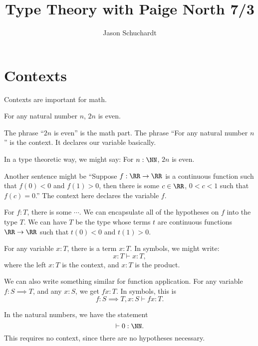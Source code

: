 \documentclass{article}
\title{Type Theory with Paige North 7/3}
\author{Jason Schuchardt}
\newcommand{\yields}{\vdash}
\begin{document}
\maketitle

\section{Contexts}

Contexts are important for math.

\begin{example}
    For any natural number $n$, $2n$ is even.

    The phrase ``$2n$ is even'' is the math part.
    The phrase ``For any natural number $n$'' is the context.
    It declares our variable basically.

    In a type theoretic way, we might say:
    For $n:\NN$, $2n$ is even.
\end{example}

\begin{example}
Another sentence might be 
``Suppose $f:\RR\to\RR$ is a continuous function such that 
$f(0)<0$ and $f(1)>0$, then there is some $c\in\RR$, 
$0 < c < 1$ such that
$f(c)=0$.''
The context here declares the variable $f$.
\end{example}

\begin{example}
For $f:T$, there is some $\cdots$. We can encapsulate all of the
hypotheses on $f$ into the type $T$. We can have $T$ be 
the type whose terms $t$ are continuous functions $\RR\to \RR$
such that $t(0)<0$ and $t(1)>0$.
\end{example}

\begin{example}
    For any variable $x:T$, there is a term $x:T$.
    In symbols, we might write:
    \[ x:T \yields x : T,\]
    where the left $x:T$ is the context, and $x:T$ is the product.
\end{example}

\begin{example}
    We can also write something similar for function application.
    For any variable $f:S\implies T$, and any $x:S$, we get
    $fx :T$. In symbols, this is 
    \[ f:S\implies T, x:S \yields fx:T.\]
\end{example}

\begin{example}
    In the natural numbers, we have the statement
    \[\yields 0:\NN.\]
    This requires no context, since there are no hypotheses 
    necessary.
\end{example}
\end{document}
